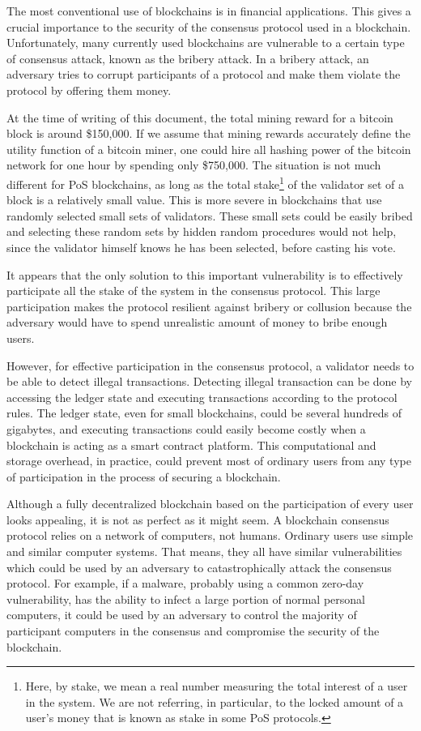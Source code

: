 The most conventional use of blockchains is in financial applications. This gives a crucial importance to the
security of the consensus protocol used in a blockchain. Unfortunately, many currently used blockchains are
vulnerable to a
certain type of consensus attack, known as the bribery attack. In a bribery attack, an adversary tries to corrupt
participants of a protocol and make them violate the protocol by offering them money.

At the time of writing of this document,
the total mining reward for a bitcoin block is around \$150,000. If we assume that mining rewards accurately define
the utility function of a bitcoin miner, one could hire all hashing power of the bitcoin network for one hour by
spending
only \$750,000. The situation is not much different for PoS blockchains, as long as the total stake\footnote{Here, by
stake, we mean a real number measuring the total interest of a user in the system. We are not referring, in
particular, to the locked amount of a user's money that is known as stake in some PoS protocols.}
of the validator set of a block is a relatively small value. This is more severe in blockchains that use
randomly selected small sets of validators. These small sets could be easily bribed and selecting these random sets
by hidden random procedures would not help, since the validator himself knows he has been selected, before casting
his vote.

It appears that the only solution to this important vulnerability is to effectively participate all the stake of the
system in the consensus protocol. This large participation makes the protocol resilient against bribery or
collusion because the adversary would have to spend unrealistic amount of money to bribe enough users.

However, for effective participation in the consensus protocol, a validator needs to be able to detect
illegal transactions. Detecting illegal transaction can be done by accessing the ledger
state and executing transactions according to the protocol rules. The
ledger state, even for small blockchains, could be several
hundreds of gigabytes, and executing transactions could easily become costly when a blockchain is acting as a
smart contract platform. This computational and storage overhead, in practice, could prevent most of
ordinary users from any type of participation in the process of securing a blockchain.

Although a fully decentralized blockchain based on the participation of every user looks appealing, it is not as perfect
as it might seem. A blockchain consensus protocol relies on a network of computers, not humans. Ordinary users use
simple and similar computer systems. That means, they all have similar vulnerabilities which could be used by an
adversary to catastrophically attack the consensus protocol. For example, if a malware, probably using a common zero-day
vulnerability, has the ability to infect a large portion of normal personal computers, it could be used by an
adversary to control the majority of participant computers in the consensus and compromise the security of the
blockchain.


